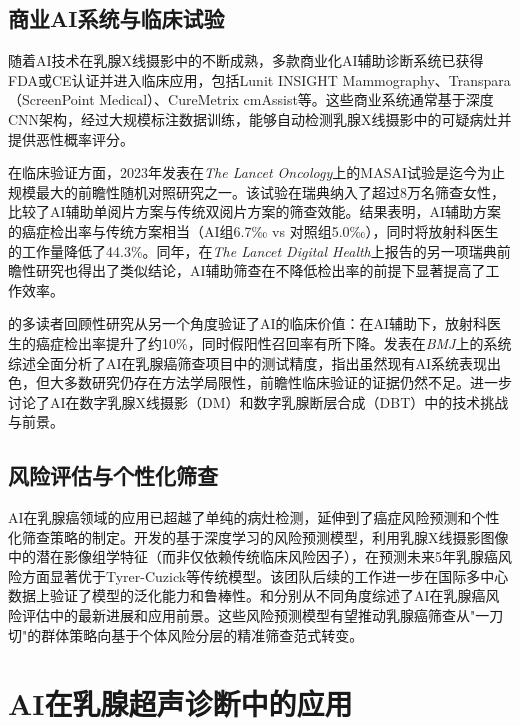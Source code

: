 \documentclass[12pt,a4paper]{article}
\begin{document}
\subsection{商业AI系统与临床试验}

随着AI技术在乳腺X线摄影中的不断成熟，多款商业化AI辅助诊断系统已获得FDA或CE认证并进入临床应用，包括Lunit INSIGHT Mammography、Transpara（ScreenPoint Medical）、CureMetrix cmAssist等。这些商业系统通常基于深度CNN架构，经过大规模标注数据训练，能够自动检测乳腺X线摄影中的可疑病灶并提供恶性概率评分。

在临床验证方面，2023年发表在\textit{The Lancet Oncology}上的MASAI试验是迄今为止规模最大的前瞻性随机对照研究之一\citep{lang2023artificial}。该试验在瑞典纳入了超过8万名筛查女性，比较了AI辅助单阅片方案与传统双阅片方案的筛查效能。结果表明，AI辅助方案的癌症检出率与传统方案相当（AI组6.7‰ vs 对照组5.0‰），同时将放射科医生的工作量降低了44.3\%。同年，\citet{dembrower2023artificial}在\textit{The Lancet Digital Health}上报告的另一项瑞典前瞻性研究也得出了类似结论，AI辅助筛查在不降低检出率的前提下显著提高了工作效率。

\citet{kim2020changes}的多读者回顾性研究从另一个角度验证了AI的临床价值：在AI辅助下，放射科医生的癌症检出率提升了约10\%，同时假阳性召回率有所下降。\citet{freeman2021use}发表在\textit{BMJ}上的系统综述全面分析了AI在乳腺癌筛查项目中的测试精度，指出虽然现有AI系统表现出色，但大多数研究仍存在方法学局限性，前瞻性临床验证的证据仍然不足。\citet{diaz2024artificial}进一步讨论了AI在数字乳腺X线摄影（DM）和数字乳腺断层合成（DBT）中的技术挑战与前景。

\subsection{风险评估与个性化筛查}

AI在乳腺癌领域的应用已超越了单纯的病灶检测，延伸到了癌症风险预测和个性化筛查策略的制定。\citet{yala2019deep}开发的基于深度学习的风险预测模型，利用乳腺X线摄影图像中的潜在影像组学特征（而非仅依赖传统临床风险因子），在预测未来5年乳腺癌风险方面显著优于Tyrer-Cuzick等传统模型。该团队后续的工作\citep{yala2022optimizing}进一步在国际多中心数据上验证了模型的泛化能力和鲁棒性。\citet{lowry2024artificial}和\citet{siddique2023tomography}分别从不同角度综述了AI在乳腺癌风险评估中的最新进展和应用前景。这些风险预测模型有望推动乳腺癌筛查从"一刀切"的群体策略向基于个体风险分层的精准筛查范式转变\citep{dembrower2020effect}。

\section{AI在乳腺超声诊断中的应用}
\end{document}
